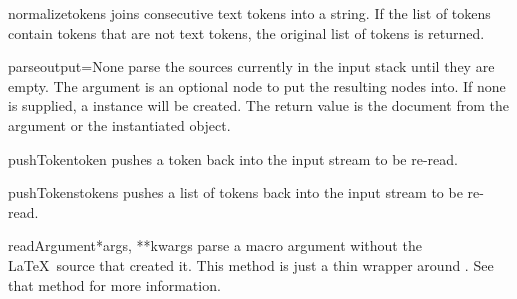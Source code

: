 \begin{methoddesc}[TeX]{normalize}{tokens}
joins consecutive text tokens into a string.  If the list of tokens contain
tokens that are not text tokens, the original list of tokens is returned.
\end{methoddesc}

\begin{methoddesc}[TeX]{parse}{output=None}
parse the sources currently in the input stack until they are empty.
The  argument is an optional  node to put
the resulting nodes into.  If none is supplied, a 
instance will be created.  The return value is the document from the
 argument or the instantiated  object.
\end{methoddesc}

\begin{methoddesc}[TeX]{pushToken}{token}
pushes a token back into the input stream to be re-read.
\end{methoddesc}

\begin{methoddesc}[TeX]{pushTokens}{tokens}
pushes a list of tokens back into the input stream to be re-read.
\end{methoddesc}

\begin{methoddesc}[TeX]{readArgument}{*args, **kwargs}
parse a macro argument without the \LaTeX\ source that created it.
This method is just a thin wrapper around .
See that method for more information.
\end{methoddesc}


